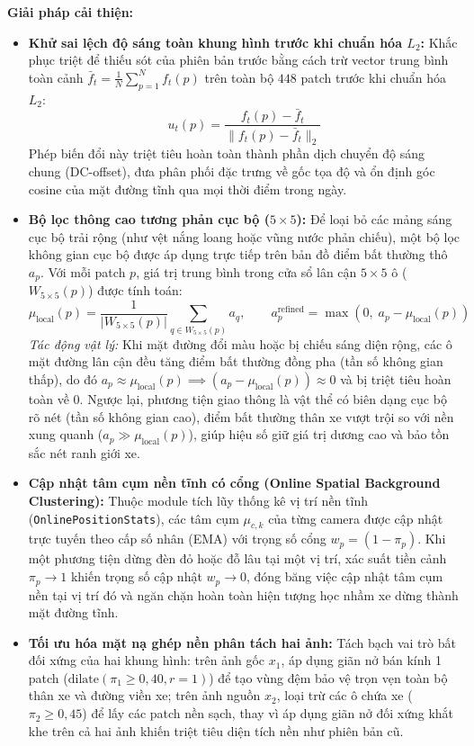 \documentclass[11pt,a4paper]{article}
\begin{document}
\textbf{Giải pháp cải thiện:}
\begin{itemize}
    \item \textbf{Khử sai lệch độ sáng toàn khung hình trước khi chuẩn hóa $L_2$:} 
    Khắc phục triệt để thiếu sót của phiên bản trước bằng cách trừ vector trung bình toàn cảnh $\bar{f}_t = \frac{1}{N}\sum_{p=1}^N f_t(p)$ trên toàn bộ $448$ patch trước khi chuẩn hóa $L_2$:
    \begin{equation}
        u_t(p) = \frac{f_t(p) - \bar{f}_t}{\|f_t(p) - \bar{f}_t\|_2}
    \end{equation}
    Phép biến đổi này triệt tiêu hoàn toàn thành phần dịch chuyển độ sáng chung (DC-offset), đưa phân phối đặc trưng về gốc tọa độ và ổn định góc cosine của mặt đường tĩnh qua mọi thời điểm trong ngày.

    \item \textbf{Bộ lọc thông cao tương phản cục bộ ($5 \times 5$):} 
    Để loại bỏ các mảng sáng cục bộ trải rộng (như vệt nắng loang hoặc vũng nước phản chiếu), một bộ lọc không gian cục bộ được áp dụng trực tiếp trên bản đồ điểm bất thường thô $a_p$. Với mỗi patch $p$, giá trị trung bình trong cửa sổ lân cận $5 \times 5$ ô ($W_{5 \times 5}(p)$) được tính toán:
    \begin{equation}
        \mu_{\text{local}}(p) = \frac{1}{|W_{5 \times 5}(p)|} \sum_{q \in W_{5 \times 5}(p)} a_q, \quad\quad a_p^{\text{refined}} = \max\left(0, \; a_p - \mu_{\text{local}}(p)\right)
    \end{equation}
    \textit{Tác động vật lý:} Khi mặt đường đổi màu hoặc bị chiếu sáng diện rộng, các ô mặt đường lân cận đều tăng điểm bất thường đồng pha (tần số không gian thấp), do đó $a_p \approx \mu_{\text{local}}(p) \implies (a_p - \mu_{\text{local}}(p)) \approx 0$ và bị triệt tiêu hoàn toàn về $0$. Ngược lại, phương tiện giao thông là vật thể có biên dạng cục bộ rõ nét (tần số không gian cao), điểm bất thường thân xe vượt trội so với nền xung quanh ($a_p \gg \mu_{\text{local}}(p)$), giúp hiệu số giữ giá trị dương cao và bảo tồn sắc nét ranh giới xe.

    \item \textbf{Cập nhật tâm cụm nền tĩnh có cổng (Online Spatial Background Clustering):} 
    Thuộc module tích lũy thống kê vị trí nền tĩnh (\texttt{OnlinePositionStats}), các tâm cụm $\mu_{c, k}$ của từng camera được cập nhật trực tuyến theo cấp số nhân (EMA) với trọng số cổng $w_p = (1 - \pi_p)$. Khi một phương tiện dừng đèn đỏ hoặc đỗ lâu tại một vị trí, xác suất tiền cảnh $\pi_p \to 1$ khiến trọng số cập nhật $w_p \to 0$, đóng băng việc cập nhật tâm cụm nền tại vị trí đó và ngăn chặn hoàn toàn hiện tượng học nhầm xe dừng thành mặt đường tĩnh.

    \item \textbf{Tối ưu hóa mặt nạ ghép nền phân tách hai ảnh:} 
    Tách bạch vai trò bất đối xứng của hai khung hình: trên ảnh gốc $x_1$, áp dụng giãn nở bán kính 1 patch ($\text{dilate}(\pi_1 \ge 0{,}40, r=1)$) để tạo vùng đệm bảo vệ trọn vẹn toàn bộ thân xe và đường viền xe; trên ảnh nguồn $x_2$, loại trừ các ô chứa xe ($\pi_2 \ge 0{,}45$) để lấy các patch nền sạch, thay vì áp dụng giãn nở đối xứng khắt khe trên cả hai ảnh khiến triệt tiêu diện tích nền như phiên bản cũ.
\end{itemize}
\end{document}
